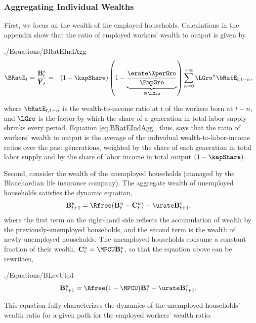 \documentclass[titlepage]{\econtex}\newcommand{\texname}{cjSOE}
\renewcommand{\GDPLev}{\ensuremath{\pmb{Y}}}
\begin{document}
\subsubsection{Aggregating Individual Wealths}

First, we focus on the wealth of the employed households. Calculations
in the appendix show that the ratio of employed workers' wealth to
output is given by
\begin{verbatimwrite}{./Equations/BRatEIndAgg}
\begin{eqnarray}
\BRatE_{t} = \frac{\BLevE_t}{\GDPLev_t} & = & (1-\kapShare) \left(1-\underbrace{\frac{\erate\XperGro}{\EmpGro}}_{\equiv \LGro}\right) \sum_{n=0}^{+\infty}\LGro^{n} \bRatE_{t,t-n}, \label{eq:LGro} \label{eq:BRatEIndAgg}
\end{eqnarray}
\end{verbatimwrite}

where $\bRatE_{t,t-n}$ is the wealth-to-income ratio at $t$ of the workers born at $t-n$, and $\LGro$ is the factor by which the share of a generation in total labor supply shrinks every period. Equation \eqref{eq:BRatEIndAgg}, thus, says that the ratio of workers' wealth to output is the average of the individual wealth-to-labor-income ratios over the past generations, weighted by the share of each generation in total labor supply and by the share of labor income in total output $(1-\kapShare)$.

Second, consider the wealth of the unemployed households (managed by the Blanchardian life insurance company). The aggregate wealth of unemployed households satisfies the dynamic equation,
\begin{equation*}
\BLevU_{t+1}= \Rfree (\BLevU_{t} -\CLevU_t)+ \urate \BLevE_{t+1},
\end{equation*}
where the first term on the right-hand side reflects the accumulation of wealth by the previously-unemployed households, and the second term is the wealth of newly-unemployed households. The unemployed households consume a constant fraction of their wealth, $\CLevU_t= \MPCU \BLevU_{t}$, so that the equation above can be rewritten,
\begin{verbatimwrite}{./Equations/BLevUtp1}
\begin{equation}
\BLevU_{t+1}= \Rfree (1-\MPCU) \BLevU_{t}+ \urate \BLevE_{t+1}.
\label{eq:BLevUtp1}
\end{equation}
\end{verbatimwrite}

This equation fully characterizes the dynamics of the unemployed households' wealth ratio for a given path for the employed workers' wealth ratio.
\end{document}
